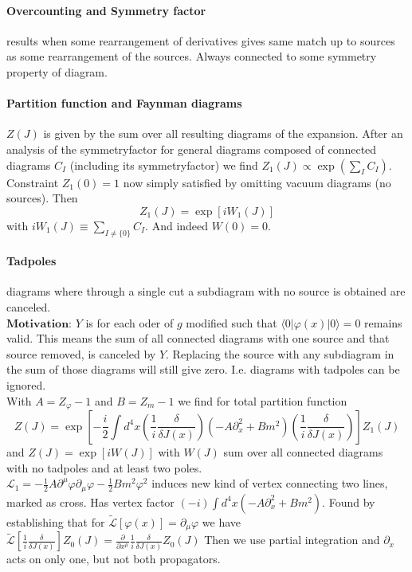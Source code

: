 \paragraph{Overcounting and Symmetry factor} results when some rearrangement of derivatives gives same match up 
to sources as some rearrangement of the sources. Always connected to some symmetry property of diagram.

\paragraph{Partition function and Faynman diagrams} $Z(J)$ is given by the sum over all resulting diagrams 
of   the expansion. After an analysis of the symmetryfactor for general diagrams composed of connected diagrams 
$C_I$ (including its symmetryfactor) we find $Z_1(J) \propto \exp(\sum_I C_I)$. Constraint $Z_1(0)=1$ now 
simply satisfied by omitting vacuum diagrams (no sources). Then $$Z_1(J)=\exp \left[i W_1(J)\right]$$ 
with $i W_1(J) \equiv \sum_{I \neq\{0\}} C_I$. And indeed $W(0) = 0$.

\paragraph{Tadpoles} diagrams where through a single cut a subdiagram with no source is obtained are canceled.\\
$\textbf{Motivation:}$ $Y$ is for each oder of $g$ modified such that $\langle 0|\varphi(x)| 0\rangle=0$ remains valid.
This means the sum of all connected diagrams with one source and that source removed, is canceled by $Y$. Replacing the source with any
subdiagram in the sum of those diagrams will still give zero. I.e. diagrams with tadpoles can be ignored. \\

With $A=Z_\varphi -1$ and $B=Z_m -1$ we find for total partition function
$$Z(J)=\exp \left[-\frac{i}{2} \int d^4 x\left(\frac{1}{i} \frac{\delta}{\delta J(x)}\right)\left(-A \partial_x^2+B m^2\right)\left(\frac{1}{i} \frac{\delta}{\delta J(x)}\right)\right] Z_1(J)$$
and $Z(J)=\exp [i W(J)]$ with $W(J)$ sum over all connected diagrams with no tadpoles and at least two poles.\\

$\mathcal{L}_1=-\frac{1}{2} A \partial^\mu \varphi \partial_\mu \varphi-\frac{1}{2} B m^2 \varphi^2$ induces 
new kind of vertex connecting two lines, marked as cross. Has vertex factor $(-i) \int d^4 x\left(-A \partial_x^2+B m^2\right)$.
Found by establishing that for $\tilde{\mathcal{L}}[\varphi(x)] = \partial_\mu \varphi$ we 
have $\tilde{\mathcal{L}} \left [ \frac{1}{i} \frac{\delta}{\delta J(x)} \right ] Z_0(J)= \frac{\partial}{\partial x^\mu} \frac{1}{i} \frac{\delta}{\delta J(x)} Z_0(J)$
Then we use partial integration and $\partial_x$ acts on only one, but not both propagators. 

